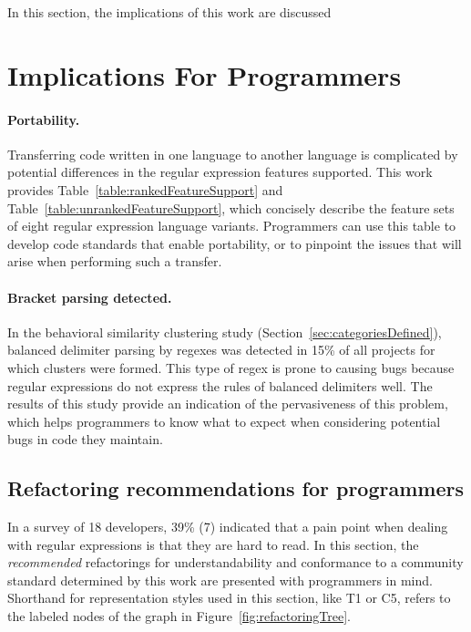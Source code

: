 In this section, the implications of this work are discussed

\section{Implications For Programmers}

\paragraph{Portability.} Transferring code written in one language to another language is complicated by potential differences in the regular expression features supported.  This work provides Table~\ref{table:rankedFeatureSupport} and Table~\ref{table:unrankedFeatureSupport}, which concisely describe the feature sets of eight regular expression language variants.  Programmers can use this table to develop code standards that enable portability, or to pinpoint the issues that will arise when performing such a transfer.

\paragraph{Bracket parsing detected.} In the behavioral similarity clustering study (Section~\ref{sec:categoriesDefined}), balanced delimiter parsing by regexes was detected in 15\% of all projects for which clusters were formed.  This type of regex is prone to causing bugs because regular expressions do not express the rules of balanced delimiters well.  The results of this study provide an indication of the pervasiveness of this problem, which helps programmers to know what to expect when considering potential bugs in code they maintain.

\subsection{Refactoring recommendations for programmers}
In a survey of 18 developers, 39\% (7) indicated that a pain point when dealing with regular expressions is that they are hard to read.  In this section, the \emph{recommended} refactorings for understandability and conformance to a community standard determined by this work are presented with programmers in mind.  Shorthand for representation styles used in this section, like T1 or C5, refers to the labeled nodes of the graph in Figure~\ref{fig:refactoringTree}.

